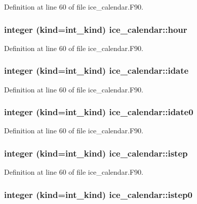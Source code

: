 Definition at line 60 of file ice\_\-calendar.F90.\hypertarget{namespaceice__calendar_a0d6f497f4cdeb0413e2c5eadca76d8a1}{
\subsubsection[{hour}]{\setlength{\rightskip}{0pt plus 5cm}integer (kind=int\_\-kind) {\bf ice\_\-calendar::hour}}}
\label{namespaceice__calendar_a0d6f497f4cdeb0413e2c5eadca76d8a1}


Definition at line 60 of file ice\_\-calendar.F90.\hypertarget{namespaceice__calendar_aefc3f061e0c4d064b85e0fa84f0c92af}{
\subsubsection[{idate}]{\setlength{\rightskip}{0pt plus 5cm}integer (kind=int\_\-kind) {\bf ice\_\-calendar::idate}}}
\label{namespaceice__calendar_aefc3f061e0c4d064b85e0fa84f0c92af}


Definition at line 60 of file ice\_\-calendar.F90.\hypertarget{namespaceice__calendar_a60baa4e8bed2d175eaf6170ab792aa03}{
\subsubsection[{idate0}]{\setlength{\rightskip}{0pt plus 5cm}integer (kind=int\_\-kind) {\bf ice\_\-calendar::idate0}}}
\label{namespaceice__calendar_a60baa4e8bed2d175eaf6170ab792aa03}


Definition at line 60 of file ice\_\-calendar.F90.\hypertarget{namespaceice__calendar_a6899d76938ada3889a62308eb41331bf}{
\subsubsection[{istep}]{\setlength{\rightskip}{0pt plus 5cm}integer (kind=int\_\-kind) {\bf ice\_\-calendar::istep}}}
\label{namespaceice__calendar_a6899d76938ada3889a62308eb41331bf}


Definition at line 60 of file ice\_\-calendar.F90.\hypertarget{namespaceice__calendar_a225919cc1367b6648a33740b98427512}{
\subsubsection[{istep0}]{\setlength{\rightskip}{0pt plus 5cm}integer (kind=int\_\-kind) {\bf ice\_\-calendar::istep0}}}
\label{namespaceice__calendar_a225919cc1367b6648a33740b98427512}


